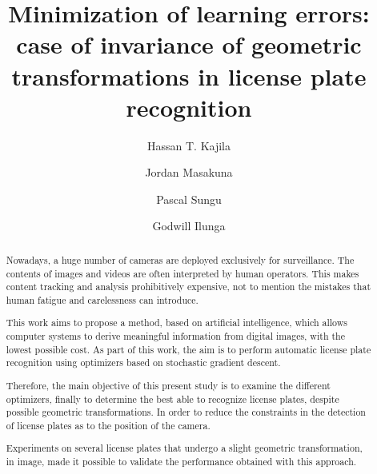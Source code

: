 \documentclass[lnbip]{svmultln}
\begin{document}
%
\mainmatter              %
%
\title{Minimization of learning errors: case of invariance of geometric transformations in license plate recognition}
%
%
\author{Hassan T. Kajila \and Jordan Masakuna \and
Pascal Sungu \and Godwill Ilunga  }
%
%
%
\maketitle              %

\begin{abstract}        %
	Nowadays, a huge number of cameras are deployed exclusively for surveillance. The contents of images and videos are often interpreted by human operators. This makes content tracking and analysis prohibitively expensive, not to mention the mistakes that human fatigue and carelessness can introduce.
	
	This work aims to propose a method, based on artificial intelligence, which allows computer systems to derive meaningful information from digital images, with the lowest possible cost. As part of this work, the aim is to perform automatic license plate recognition using optimizers based on stochastic gradient descent.
	
	Therefore, the main objective of this present study is to examine the different optimizers, finally to determine the best able to recognize license plates, despite possible geometric transformations. In order to reduce the constraints in the detection of license plates as to the position of the camera.
	
	Experiments on several license plates that undergo a slight geometric transformation, in image, made it possible to validate the performance obtained with this approach.
\end{abstract}
\end{document}
